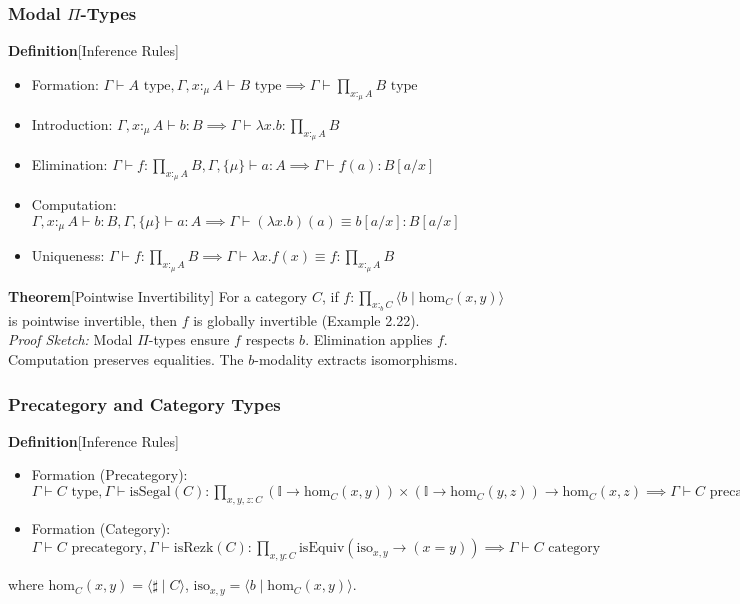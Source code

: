 \documentclass{article}
\begin{document}
\subsubsection{Modal $\Pi$-Types}
\textbf{Definition}[Inference Rules]
\begin{itemize}
    \item Formation: $\Gamma \vdash A \text{ type}, \Gamma, x :_\mu A \vdash B \text{ type} \implies \Gamma \vdash \prod_{x :_\mu A} B \text{ type}$
    \item Introduction: $\Gamma, x :_\mu A \vdash b : B \implies \Gamma \vdash \lambda x. b : \prod_{x :_\mu A} B$
    \item Elimination: $\Gamma \vdash f : \prod_{x :_\mu A} B, \Gamma, \{\mu\} \vdash a : A \implies \Gamma \vdash f(a) : B[a / x]$
    \item Computation: $\Gamma, x :_\mu A \vdash b : B, \Gamma, \{\mu\} \vdash a : A \implies \Gamma \vdash (\lambda x. b)(a) \equiv b[a / x] : B[a / x]$
    \item Uniqueness: $\Gamma \vdash f : \prod_{x :_\mu A} B \implies \Gamma \vdash \lambda x. f(x) \equiv f : \prod_{x :_\mu A} B$
\end{itemize}

\textbf{Theorem}[Pointwise Invertibility]
For a category $C$, if $f : \prod_{x :_b C} \langle b \mid \text{hom}_C(x, y) \rangle$ is pointwise invertible, then $f$ is globally invertible (Example 2.22). \\
\textit{Proof Sketch:} Modal $\Pi$-types ensure $f$ respects $b$. Elimination applies $f$. Computation preserves equalities. The $b$-modality extracts isomorphisms.

\subsubsection{Precategory and Category Types}
\textbf{Definition}[Inference Rules]
\begin{itemize}
    \item Formation (Precategory): $\Gamma \vdash C \text{ type}, \Gamma \vdash \text{isSegal}(C) : \prod_{x,y,z : C} (\mathbb{I} \to \text{hom}_C(x,y)) \times (\mathbb{I} \to \text{hom}_C(y,z)) \to \text{hom}_C(x,z) \implies \Gamma \vdash C \text{ precategory}$
    \item Formation (Category): $\Gamma \vdash C \text{ precategory}, \Gamma \vdash \text{isRezk}(C) : \prod_{x,y : C} \text{isEquiv}(\text{iso}_{x,y} \to (x = y)) \implies \Gamma \vdash C \text{ category}$
\end{itemize}
where $\text{hom}_C(x,y) = \langle \sharp \mid C \rangle$, $\text{iso}_{x,y} = \langle b \mid \text{hom}_C(x,y) \rangle$.
\end{document}
